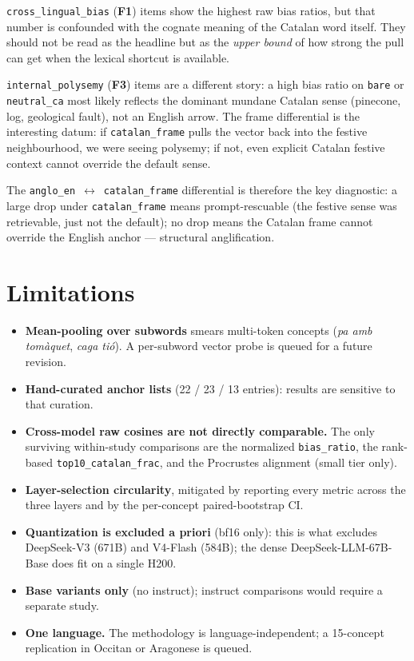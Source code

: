 \documentclass[10pt,twocolumn,a4paper]{article}
\newcommand{\code}[1]{\texttt{\small #1}}
\newcommand{\concept}[1]{\emph{#1}}
\newcommand{\Fone}{\textbf{F1}}
\newcommand{\Fthree}{\textbf{F3}}
\begin{document}
\code{cross\_lingual\_bias} (\Fone{}) items show the highest raw bias ratios,
but that number is confounded with the cognate meaning of the Catalan word
itself. They should not be read as the headline but as the \emph{upper bound}
of how strong the pull can get when the lexical shortcut is available.

\code{internal\_polysemy} (\Fthree{}) items are a different story: a high bias
ratio on \code{bare} or \code{neutral\_ca} most likely reflects the dominant
mundane Catalan sense (pinecone, log, geological fault), not an English arrow.
The frame differential is the interesting datum: if \code{catalan\_frame}
pulls the vector back into the festive neighbourhood, we were seeing polysemy;
if not, even explicit Catalan festive context cannot override the default
sense.

The \code{anglo\_en}~$\leftrightarrow$~\code{catalan\_frame} differential is
therefore the key diagnostic: a large drop under \code{catalan\_frame} means
prompt-rescuable (the festive sense was retrievable, just not the default); no
drop means the Catalan frame cannot override the English anchor --- structural
anglification.

\section{Limitations}\label{sec:limitations}

\begin{itemize}[leftmargin=1.3em,itemsep=3pt,topsep=2pt]
  \item \textbf{Mean-pooling over subwords} smears multi-token concepts
        (\concept{pa amb tomàquet}, \concept{caga tió}). A per-subword vector
        probe is queued for a future revision.
  \item \textbf{Hand-curated anchor lists} (22 / 23 / 13 entries): results are
        sensitive to that curation.
  \item \textbf{Cross-model raw cosines are not directly comparable.} The only
        surviving within-study comparisons are the normalized
        \code{bias\_ratio}, the rank-based \code{top10\_catalan\_frac}, and the
        Procrustes alignment (small tier only).
  \item \textbf{Layer-selection circularity}, mitigated by reporting every
        metric across the three layers and by the per-concept paired-bootstrap
        CI.
  \item \textbf{Quantization is excluded a priori} (bf16 only): this is what
        excludes DeepSeek-V3 (671B) and V4-Flash (584B); the dense
        DeepSeek-LLM-67B-Base does fit on a single H200.
  \item \textbf{Base variants only} (no instruct); instruct comparisons would
        require a separate study.
  \item \textbf{One language.} The methodology is language-independent; a
        15-concept replication in Occitan or Aragonese is queued.
\end{itemize}
\end{document}
